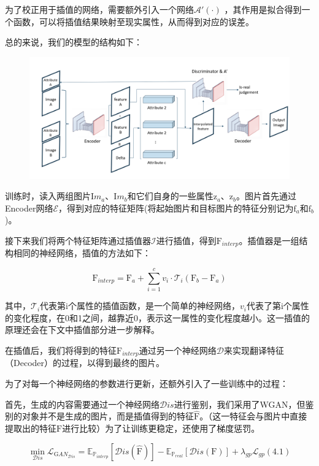 \documentclass[UTF8,a4paper，12pt]{article}
\def\MC {\mathcal}
\theoremstyle{theorem}
\theoremstyle{definition}
\begin{document}
为了校正用于插值的网络，需要额外引入一个网络$\MC A'(\cdot)$ ，其作用是拟合得到一个函数，可以将插值结果映射至现实属性，从而得到对应的误差。

总的来说，我们的模型的结构如下：

\begin{figure}[htbp]
	\centering
	\includegraphics[width=1.0\textwidth]{assets/mdl}
	\caption{}
\end{figure}

训练时，读入两组图片$\mathrm Im_a$、$\mathrm Im_b$和它们自身的一些属性$\mathrm z_a$、$\mathrm z_b$。图片首先通过Encoder网络$\MC E$，得到对应的特征矩阵(将起始图片和目标图片的特征分别记为$\mathrm f_a$和$\mathrm f_b$)。

接下来我们将两个特征矩阵通过插值器$\MC I$进行插值，得到$\mathrm F_{interp}$。插值器是一组结构相同的神经网络，插值的方法如下：

$$\mathrm F_{interp} = \mathrm F_a + \sum_{i=1}^{c}{v_i \cdot \MC T_i(\mathrm F_b - \mathrm F_a)}$$

其中，$\MC T_i$代表第$\mathrm i$个属性的插值函数，是一个简单的神经网络，$v_i$代表了第$\mathrm i$个属性的变化程度，在0和1之间，越靠近0，表示这一属性的变化程度越小。这一插值的原理还会在下文中插值部分进一步解释。

在插值后，我们将得到的特征$\mathrm F_{interp}$通过另一个神经网络$\MC D$来实现翻译特征（Decoder）的过程，以得到最终的图片。

为了对每一个神经网络的参数进行更新，还额外引入了一些训练中的过程：

首先，生成的内容需要通过一个神经网络$\MC Dis$进行鉴别，我们采用了WGAN，但鉴别的对象并不是生成的图片，而是插值得到的特征$\hat{\mathrm F}$。（这一特征会与图片中直接提取出的特征$\mathrm F$进行比较）为了让训练更稳定，还使用了梯度惩罚。

$$\min_{\MC Dis} \MC L_{\mathrm GAN_{\MC Dis}} = \mathbb E_{\mathbb P_{interp}}[\MC Dis(\hat{\mathrm F})] - \mathbb E_{\mathbb P_{real}}[\MC Dis(\mathrm F)] + \lambda_{gp}\MC L_{gp}    (4.1)$$
\end{document}
